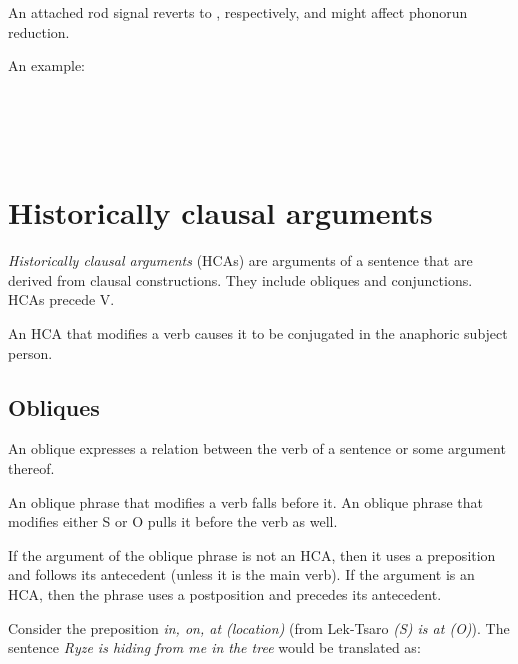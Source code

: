 \documentclass{book}
\begin{document}
An attached rod signal reverts  to , respectively, and might affect phonorun reduction.

An example: \\
~\\
 \\
 \\
     \\
    

\section{Historically clausal arguments}

\emph{Historically clausal arguments} (HCAs) are arguments of a sentence that are derived from clausal constructions. They include obliques and conjunctions. HCAs precede V.

An HCA that modifies a verb causes it to be conjugated in the anaphoric subject person.

\subsection{Obliques}

An oblique expresses a relation between the verb of a sentence or some argument thereof.

An oblique phrase that modifies a verb falls before it. An oblique phrase that modifies either S or O pulls it before the verb as well.

If the argument of the oblique phrase is not an HCA, then it uses a preposition and follows its antecedent (unless it is the main verb). If the argument is an HCA, then the phrase uses a postposition and precedes its antecedent.

Consider the preposition  \emph{in, on, at (location)} (from Lek-Tsaro  \emph{(S) is at (O)}). The sentence \emph{Ryze is hiding from me in the tree} would be translated as: \\
~\\
 \\
     \\
\end{document}
